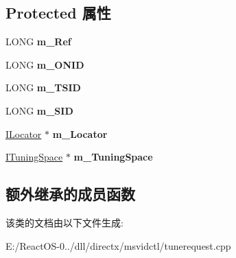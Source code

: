 \subsection*{Protected 属性}
\begin{DoxyCompactItemize}
\item 
\mbox{\label{class_c_tune_request_a500923359ab79a7e195203d6335c269c}} 
L\+O\+NG {\bfseries m\+\_\+\+Ref}
\item 
\mbox{\label{class_c_tune_request_a8b160ef9a44d22e4f0beb616c1f340fd}} 
L\+O\+NG {\bfseries m\+\_\+\+O\+N\+ID}
\item 
\mbox{\label{class_c_tune_request_a7243e923f93a7fd27c032f5fb09d196b}} 
L\+O\+NG {\bfseries m\+\_\+\+T\+S\+ID}
\item 
\mbox{\label{class_c_tune_request_a9e5120f586b69280f45f7c700ef85941}} 
L\+O\+NG {\bfseries m\+\_\+\+S\+ID}
\item 
\mbox{\label{class_c_tune_request_a217f12e4554e5920e1e54826e2e771bb}} 
\hyperlink{interface_i_locator}{I\+Locator} $\ast$ {\bfseries m\+\_\+\+Locator}
\item 
\mbox{\label{class_c_tune_request_a117073a5bbb20b616854c2a82743c162}} 
\hyperlink{interface_i_tuning_space}{I\+Tuning\+Space} $\ast$ {\bfseries m\+\_\+\+Tuning\+Space}
\end{DoxyCompactItemize}
\subsection*{额外继承的成员函数}


该类的文档由以下文件生成\+:\begin{DoxyCompactItemize}
\item 
E\+:/\+React\+O\+S-\/0../dll/directx/msvidctl/tunerequest.\+cpp\end{DoxyCompactItemize}
